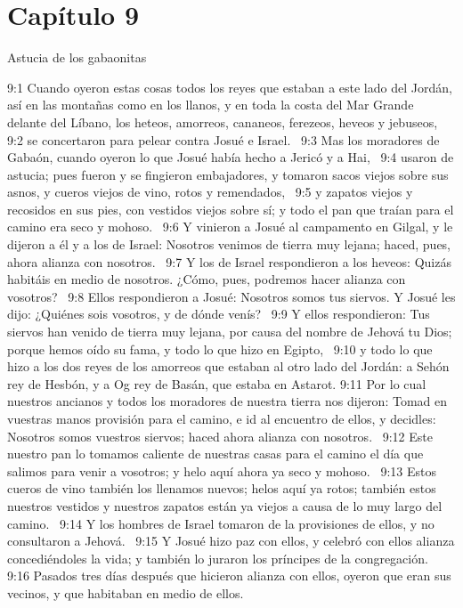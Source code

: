 \section*{Capítulo 9 }
Astucia de los gabaonitas  

9:1 Cuando oyeron estas cosas todos los reyes que estaban a este lado del Jordán, así en las montañas como en los llanos, y en toda la costa del Mar Grande delante del Líbano, los heteos, amorreos, cananeos, ferezeos, heveos y jebuseos,  
9:2 se concertaron para pelear contra Josué e Israel.  
9:3 Mas los moradores de Gabaón, cuando oyeron lo que Josué había hecho a Jericó y a Hai,  
9:4 usaron de astucia; pues fueron y se fingieron embajadores, y tomaron sacos viejos sobre sus asnos, y cueros viejos de vino, rotos y remendados,  
9:5 y zapatos viejos y recosidos en sus pies, con vestidos viejos sobre sí; y todo el pan que traían para el camino era seco y mohoso.  
9:6 Y vinieron a Josué al campamento en Gilgal, y le dijeron a él y a los de Israel: Nosotros venimos de tierra muy lejana; haced, pues, ahora alianza con nosotros.  
9:7 Y los de Israel respondieron a los heveos: Quizás habitáis en medio de nosotros. ¿Cómo, pues, podremos hacer alianza con vosotros?  
9:8 Ellos respondieron a Josué: Nosotros somos tus siervos. Y Josué les dijo: ¿Quiénes sois vosotros, y de dónde venís?  
9:9 Y ellos respondieron: Tus siervos han venido de tierra muy lejana, por causa del nombre de Jehová tu Dios; porque hemos oído su fama, y todo lo que hizo en Egipto,  
9:10 y todo lo que hizo a los dos reyes de los amorreos que estaban al otro lado del Jordán: a Sehón rey de Hesbón, y a Og rey de Basán, que estaba en Astarot. 
9:11 Por lo cual nuestros ancianos y todos los moradores de nuestra tierra nos dijeron: Tomad en vuestras manos provisión para el camino, e id al encuentro de ellos, y decidles: Nosotros somos vuestros siervos; haced ahora alianza con nosotros.  
9:12 Este nuestro pan lo tomamos caliente de nuestras casas para el camino el día que salimos para venir a vosotros; y helo aquí ahora ya seco y mohoso.  
9:13 Estos cueros de vino también los llenamos nuevos; helos aquí ya rotos; también estos nuestros vestidos y nuestros zapatos están ya viejos a causa de lo muy largo del camino.  
9:14 Y los hombres de Israel tomaron de la provisiones de ellos, y no consultaron a Jehová.  
9:15 Y Josué hizo paz con ellos, y celebró con ellos alianza concediéndoles la vida; y también lo juraron los príncipes de la congregación.  
9:16 Pasados tres días después que hicieron alianza con ellos, oyeron que eran sus vecinos, y que habitaban en medio de ellos.  
